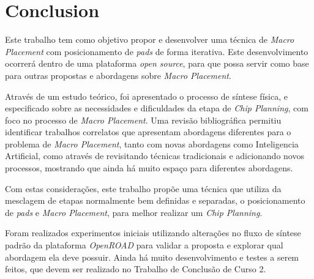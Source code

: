 \chapter{Conclusion}
Este trabalho tem como objetivo propor e desenvolver uma técnica de \textit{Macro Placement} com posicionamento de \textit{pads} de forma iterativa. Este desenvolvimento ocorrerá dentro de uma plataforma \textit{open source}, para que possa servir como base para outras propostas e abordagens sobre \textit{Macro Placement}.

Através de um estudo teórico, foi apresentado o processo de síntese física, e especificado sobre as necessidades e dificuldades da etapa de \textit{Chip Planning}, com foco no processo de \textit{Macro Placement}. Uma revisão bibliográfica permitiu identificar trabalhos correlatos que apresentam abordagens diferentes para o problema de \textit{Macro Placement}, tanto com novas abordagens como Inteligencia Artificial, como através de revisitando técnicas tradicionais e adicionando novos processos, mostrando que ainda há muito espaço para diferentes abordagens.

Com estas considerações, este trabalho propõe uma técnica que utiliza da mesclagem de etapas normalmente bem definidas e separadas, o posicionamento de \textit{pads} e 
 \textit{Macro Placement}, para melhor realizar um \textit{Chip Planning}.

 Foram realizados experimentos iniciais utilizando alterações no fluxo de síntese padrão da plataforma \textit{OpenROAD} para validar a proposta e explorar qual abordagem ela deve possuir. Ainda há muito desenvolvimento e testes a serem feitos, que devem ser realizado no Trabalho de Conclusão de Curso 2.